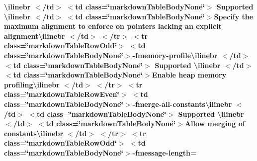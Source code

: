 \begin{longtabu}
{\bfseries{{\ttfamily \textbackslash{}ilinebr \texorpdfstring{$<$}{<}/td\texorpdfstring{$>$}{>} \texorpdfstring{$<$}{<}td class=\char`\"{}markdown\+Table\+Body\+None\char`\"{}\texorpdfstring{$>$}{>} Supported \textbackslash{}ilinebr \texorpdfstring{$<$}{<}/td\texorpdfstring{$>$}{>} \texorpdfstring{$<$}{<}td class=\char`\"{}markdown\+Table\+Body\+None\char`\"{}\texorpdfstring{$>$}{>}}Specify the maximum alignment to enforce on pointers lacking an explicit alignment{\ttfamily \textbackslash{}ilinebr \texorpdfstring{$<$}{<}/td\texorpdfstring{$>$}{>} \texorpdfstring{$<$}{<}/tr\texorpdfstring{$>$}{>} \texorpdfstring{$<$}{<}tr class=\char`\"{}markdown\+Table\+Row\+Odd\char`\"{}\texorpdfstring{$>$}{>} \texorpdfstring{$<$}{<}td class=\char`\"{}markdown\+Table\+Body\+None\char`\"{}\texorpdfstring{$>$}{>}}-\/fmemory-\/profile{\ttfamily \textbackslash{}ilinebr \texorpdfstring{$<$}{<}/td\texorpdfstring{$>$}{>} \texorpdfstring{$<$}{<}td class=\char`\"{}markdown\+Table\+Body\+None\char`\"{}\texorpdfstring{$>$}{>} Supported \textbackslash{}ilinebr \texorpdfstring{$<$}{<}/td\texorpdfstring{$>$}{>} \texorpdfstring{$<$}{<}td class=\char`\"{}markdown\+Table\+Body\+None\char`\"{}\texorpdfstring{$>$}{>}}Enable heap memory profiling{\ttfamily \textbackslash{}ilinebr \texorpdfstring{$<$}{<}/td\texorpdfstring{$>$}{>} \texorpdfstring{$<$}{<}/tr\texorpdfstring{$>$}{>} \texorpdfstring{$<$}{<}tr class=\char`\"{}markdown\+Table\+Row\+Even\char`\"{}\texorpdfstring{$>$}{>} \texorpdfstring{$<$}{<}td class=\char`\"{}markdown\+Table\+Body\+None\char`\"{}\texorpdfstring{$>$}{>}}-\/fmerge-\/all-\/constants{\ttfamily \textbackslash{}ilinebr \texorpdfstring{$<$}{<}/td\texorpdfstring{$>$}{>} \texorpdfstring{$<$}{<}td class=\char`\"{}markdown\+Table\+Body\+None\char`\"{}\texorpdfstring{$>$}{>} Supported \textbackslash{}ilinebr \texorpdfstring{$<$}{<}/td\texorpdfstring{$>$}{>} \texorpdfstring{$<$}{<}td class=\char`\"{}markdown\+Table\+Body\+None\char`\"{}\texorpdfstring{$>$}{>}}Allow merging of constants{\ttfamily \textbackslash{}ilinebr \texorpdfstring{$<$}{<}/td\texorpdfstring{$>$}{>} \texorpdfstring{$<$}{<}/tr\texorpdfstring{$>$}{>} \texorpdfstring{$<$}{<}tr class=\char`\"{}markdown\+Table\+Row\+Odd\char`\"{}\texorpdfstring{$>$}{>} \texorpdfstring{$<$}{<}td class=\char`\"{}markdown\+Table\+Body\+None\char`\"{}\texorpdfstring{$>$}{>}}-\/fmessage-\/length=}}


\end{longtabu}
